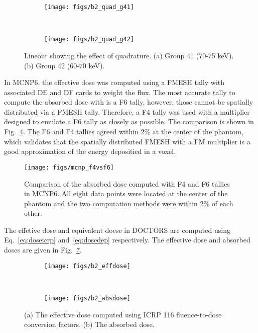 \begin{figure}
    \centering
    \begin{subfigure}[b]{0.3\textwidth}
        \texttt{[image: figs/b2\_quad\_g41]}
        \caption{}
        \label{fig:b2_quad_g41}
    \end{subfigure}
    ~ 
    \begin{subfigure}[b]{0.3\textwidth}
        \texttt{[image: figs/b2\_quad\_g42]}
        \caption{}
        \label{fig:b2_quad_g42}
    \end{subfigure}
    \caption{Lineout showing the effect of quadrature. (a) Group 41 (70-75 keV). (b) Group 42 (60-70 keV). }\label{fig:b2_quad}
\end{figure}

In MCNP6, the effective dose was computed using a FMESH tally with associated DE and DF cards to weight the flux. The most accurate tally to compute the absorbed dose with is a F6 tally, however, those cannot be spatially distributed via a FMESH tally. Therefore, a F4 tally was used with a multiplier designed to emulate a F6 tally as closely as possible. The comparison is shown in Fig.~\ref{fig:mcnp_f4vsf6}. The F6 and F4 tallies agreed within 2\% at the center of the phantom, which validates that the spatially distributed FMESH with a FM multiplier is a good approximation of the energy depositied in a voxel.

\begin{figure}[tb]
  \begin{center}
   \texttt{[image: figs/mcnp\_f4vsf6]}
  \end{center}
  \caption{Comparison of the absorbed dose computed with F4 and F6 tallies in MCNP6. All eight data points were located at the center of the phantom and the two computation methods were within 2\% of each other.}
\label{fig:mcnp_f4vsf6}
\end{figure}

The effetive dose and equivalent doese in DOCTORS are computed using Eq.~\ref{eq:doseicrp} and~\ref{eq:dosedep} respectively. The effective dose and absorbed doses are given in Fig.~\ref{fig:b2_dose}.

\begin{figure}
    \centering
    \begin{subfigure}[b]{0.45\textwidth}
        \texttt{[image: figs/b2\_effdose]}
        \caption{}
        \label{fig:b2_effdose}
    \end{subfigure}
    ~
    \begin{subfigure}[b]{0.45\textwidth}
        \texttt{[image: figs/b2\_absdose]}
        \caption{}
        \label{fig:b2_absdose}
    \end{subfigure}
    \caption{(a) The effective dose computed using ICRP 116 fluence-to-dose conversion factors. (b) The absorbed dose.}\label{fig:b2_dose}
\end{figure}


